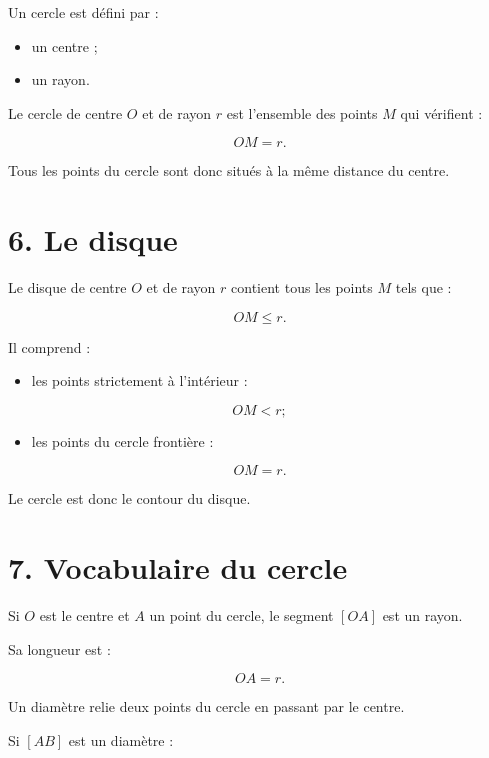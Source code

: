 Un cercle est défini par :

\begin{itemize}
\item un centre ;
\item un rayon.
\end{itemize}

Le cercle de centre $O$ et de rayon $r$ est l’ensemble des points $M$ qui vérifient :

\[
\boxed{OM=r}.
\]

Tous les points du cercle sont donc situés à la même distance du centre.

\section{6. Le disque}

Le disque de centre $O$ et de rayon $r$ contient tous les points $M$ tels que :

\[
\boxed{OM\le r}.
\]

Il comprend :

\begin{itemize}
\item les points strictement à l’intérieur :
\end{itemize}

\[
OM<r;
\]

\begin{itemize}
\item les points du cercle frontière :
\end{itemize}

\[
OM=r.
\]

Le cercle est donc le contour du disque.

\section{7. Vocabulaire du cercle}


Si $O$ est le centre et $A$ un point du cercle, le segment $[OA]$ est un rayon.

Sa longueur est :

\[
OA=r.
\]

Un diamètre relie deux points du cercle en passant par le centre.

Si $[AB]$ est un diamètre :

